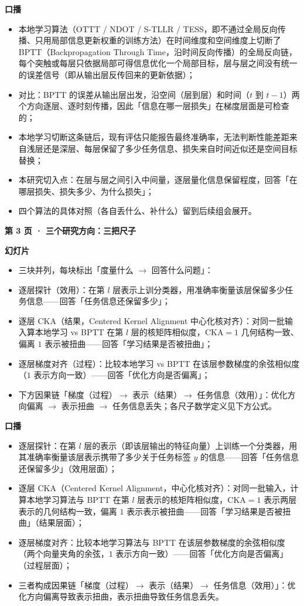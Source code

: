 \documentclass[journal,12pt,onecolumn]{IEEEtran}
\begin{document}
\textbf{口播}
\begin{itemize}[leftmargin=1.5em,itemsep=0pt]
\item 本地学习算法（OTTT / NDOT / S-TLLR / TESS，即不通过全局反向传播、只用局部信息更新权重的训练方法）在时间维度和空间维度上切断了 BPTT（Backpropagation Through Time，沿时间反向传播）的全局反向链，每个突触或每层只依据局部可得信息优化一个局部目标，层与层之间没有统一的误差信号（即从输出层反传回来的更新依据）；
\item 对比：BPTT 的误差从输出层出发，沿空间（层到层）和时间（$t$ 到 $t-1$）两个方向逐层、逐时刻传播，因此「信息在哪一层损失」在梯度层面是可检查的；
\item 本地学习切断这条链后，现有评估只能报告最终准确率，无法判断性能差距来自浅层还是深层、每层保留了多少任务信息、损失来自时间近似还是空间目标替换；
\item 本研究切入点：在层与层之间引入中间量，逐层量化信息保留程度，回答「在哪层损失、损失多少、为什么损失」；
\item 四个算法的具体对照（各自丢什么、补什么）留到后续组会展开。
\end{itemize}

\textbf{第 3 页 · 三个研究方向：三把尺子}

\textbf{幻灯片}
\begin{itemize}[leftmargin=1.5em,itemsep=0pt]
\item 三块并列，每块标出「度量什么 $\to$ 回答什么问题」：
\item 逐层探针（效用）：在第 $l$ 层表示上训分类器，用准确率衡量该层保留多少任务信息——回答「任务信息还保留多少」；
\item 逐层 CKA（结果，Centered Kernel Alignment 中心化核对齐）：对同一批输入算本地学习 vs BPTT 在第 $l$ 层的核矩阵相似度，$\mathrm{CKA}=1$ 几何结构一致、偏离 $1$ 表示被扭曲——回答「学习结果是否被扭曲」；
\item 逐层梯度对齐（过程）：比较本地学习 vs BPTT 在该层参数梯度的余弦相似度（$1$ 表示方向一致）——回答「优化方向是否偏离」；
\item 下方因果链「梯度（过程）$\to$ 表示（结果）$\to$ 任务信息（效用）」：优化方向偏离 $\to$ 表示扭曲 $\to$ 任务信息丢失；各尺子数学定义见下方公式。
\end{itemize}

\textbf{口播}
\begin{itemize}[leftmargin=1.5em,itemsep=0pt]
\item 逐层探针：在第 $l$ 层的表示（即该层输出的特征向量）上训练一个分类器，用其准确率衡量该层表示携带了多少关于任务标签 $y$ 的信息——回答「任务信息还保留多少」（效用层面）；
\item 逐层 CKA（Centered Kernel Alignment，中心化核对齐）：对同一批输入，计算本地学习算法与 BPTT 在第 $l$ 层表示的核矩阵相似度，$\mathrm{CKA}=1$ 表示两层表示的几何结构一致，偏离 $1$ 表示表示被扭曲——回答「学习结果是否被扭曲」（结果层面）；
\item 逐层梯度对齐：比较本地学习算法与 BPTT 在该层参数梯度的余弦相似度（两个向量夹角的余弦，$1$ 表示方向一致）——回答「优化方向是否偏离」（过程层面）；
\item 三者构成因果链「梯度（过程）$\to$ 表示（结果）$\to$ 任务信息（效用）」：优化方向偏离导致表示扭曲，表示扭曲导致任务信息丢失。
\end{itemize}
\end{document}
